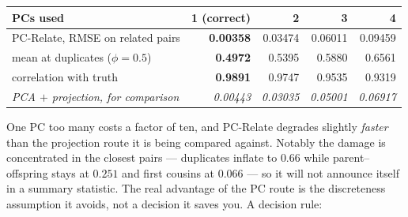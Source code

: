 \documentclass[10pt,a4paper]{article}
\begin{document}
\begin{center}
\small
\begin{tabular}{@{}lrrrr@{}}
\toprule
PCs used & 1 (correct) & 2 & 3 & 4 \\
\midrule
PC-Relate, RMSE on related pairs & \textbf{0.00358} & 0.03474 & 0.06011 & 0.09459 \\
\quad mean at duplicates ($\phi=0.5$) & \textbf{0.4972} & 0.5395 & 0.5880 & 0.6561 \\
\quad correlation with truth & \textbf{0.9891} & 0.9747 & 0.9535 & 0.9319 \\
\midrule
\emph{PCA $+$ projection, for comparison} & \emph{0.00443} & \emph{0.03035} & \emph{0.05001} & \emph{0.06917} \\
\bottomrule
\end{tabular}
\end{center}

\noindent
One PC too many costs a factor of ten, and PC-Relate degrades slightly \emph{faster} than the projection
route it is being compared against. Notably the damage is concentrated in the closest pairs --- duplicates
inflate to $0.66$ while parent--offspring stays at $0.251$ and first cousins at $0.066$ --- so it will not
announce itself in a summary statistic. The real advantage of the PC route is the discreteness assumption it
avoids, not a decision it saves you. A decision rule:
\end{document}
